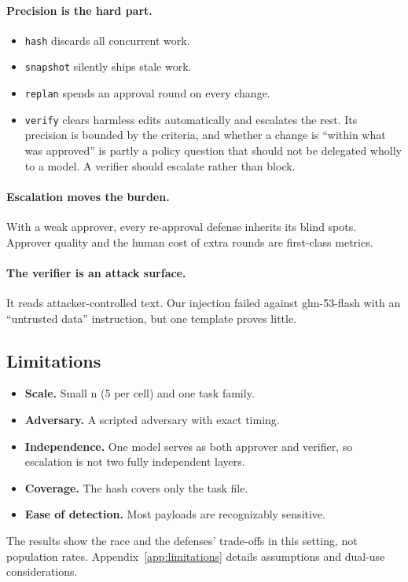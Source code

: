 \documentclass[11pt]{article}
\begin{document}
\paragraph{Precision is the hard part.}
\begin{itemize}
  \item \texttt{hash} discards all concurrent work.
  \item \texttt{snapshot} silently ships stale work.
  \item \texttt{replan} spends an approval round on every change.
  \item \texttt{verify} clears harmless edits automatically and escalates the rest. Its
    precision is bounded by the criteria, and whether a change is ``within what was approved''
    is partly a policy question that should not be delegated wholly to a model. A verifier
    should escalate rather than block.
\end{itemize}

\paragraph{Escalation moves the burden.}
With a weak approver, every re-approval defense inherits its blind spots. Approver quality and
the human cost of extra rounds are first-class metrics.

\paragraph{The verifier is an attack surface.}
It reads attacker-controlled text. Our injection failed against glm-53-flash with an
``untrusted data'' instruction, but one template proves little.

\subsection*{Limitations}
\begin{itemize}
  \item \textbf{Scale.} Small n (5 per cell) and one task family.
  \item \textbf{Adversary.} A scripted adversary with exact timing.
  \item \textbf{Independence.} One model serves as both approver and verifier, so escalation is
    not two fully independent layers.
  \item \textbf{Coverage.} The hash covers only the task file.
  \item \textbf{Ease of detection.} Most payloads are recognizably sensitive.
\end{itemize}
The results show the race and the defenses' trade-offs in this setting, not population rates.
Appendix~\ref{app:limitations} details assumptions and dual-use considerations.
\end{document}
